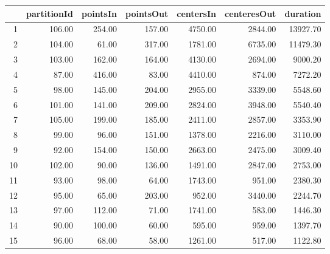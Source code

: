 \begin{table}[ht]
\centering
\begin{tabular}{rrrrrrr}
  \hline
 & partitionId & pointsIn & pointsOut & centersIn & centeresOut & duration \\ 
  \hline
1 & 106.00 & 254.00 & 157.00 & 4750.00 & 2844.00 & 13927.70 \\ 
  2 & 104.00 & 61.00 & 317.00 & 1781.00 & 6735.00 & 11479.30 \\ 
  3 & 103.00 & 162.00 & 164.00 & 4130.00 & 2694.00 & 9000.20 \\ 
  4 & 87.00 & 416.00 & 83.00 & 4410.00 & 874.00 & 7272.20 \\ 
  5 & 98.00 & 145.00 & 204.00 & 2955.00 & 3339.00 & 5548.60 \\ 
  6 & 101.00 & 141.00 & 209.00 & 2824.00 & 3948.00 & 5540.40 \\ 
  7 & 105.00 & 199.00 & 185.00 & 2411.00 & 2857.00 & 3353.90 \\ 
  8 & 99.00 & 96.00 & 151.00 & 1378.00 & 2216.00 & 3110.00 \\ 
  9 & 92.00 & 154.00 & 150.00 & 2663.00 & 2475.00 & 3009.40 \\ 
  10 & 102.00 & 90.00 & 136.00 & 1491.00 & 2847.00 & 2753.00 \\ 
  11 & 93.00 & 98.00 & 64.00 & 1743.00 & 951.00 & 2380.30 \\ 
  12 & 95.00 & 65.00 & 203.00 & 952.00 & 3440.00 & 2244.70 \\ 
  13 & 97.00 & 112.00 & 71.00 & 1741.00 & 583.00 & 1446.30 \\ 
  14 & 90.00 & 100.00 & 60.00 & 595.00 & 959.00 & 1397.70 \\ 
  15 & 96.00 & 68.00 & 58.00 & 1261.00 & 517.00 & 1122.80 \\ 
   \hline
\end{tabular}
\end{table}
